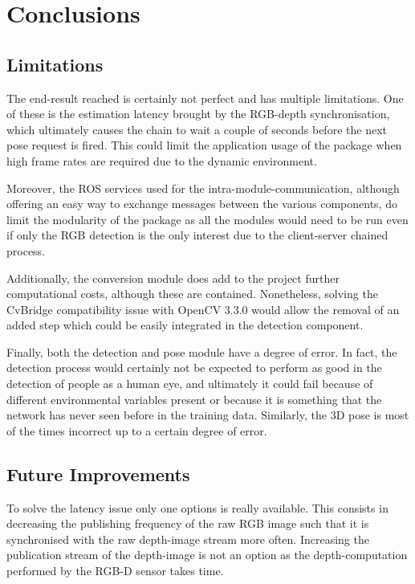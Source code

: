 \chapter{Conclusions}
\label{chapter8}

\section{Limitations}

The end-result reached is certainly not perfect and has multiple limitations. One of these is the estimation latency brought by the RGB-depth synchronisation, which ultimately causes the chain to wait a couple of seconds before the next pose request is fired. This could limit the application usage of the package when high frame rates are required due to the dynamic environment.

Moreover, the ROS services used for the intra-module-communication, although offering an easy way to exchange messages between the various components, do limit the modularity of the package as all the modules would need to be run even if only the RGB detection is the only interest due to the client-server chained process.

Additionally, the conversion module does add to the project further computational costs, although these are contained. Nonetheless, solving the CvBridge compatibility issue with OpenCV 3.3.0 would allow the removal of an added step which could be easily integrated in the detection component.

Finally, both the detection and pose module have a degree of error. In fact, the detection process would certainly not be expected to perform as good in the detection of people as a human eye, and ultimately it could fail because of different environmental variables present or because it is something that the network has never seen before in the training data. Similarly, the 3D pose is most of the times incorrect up to a certain degree of error.

\section{Future Improvements}

To solve the latency issue only one options is really available. This consists in decreasing the publishing frequency of the raw RGB image such that it is synchronised with the raw depth-image stream more often. Increasing the publication stream of the depth-image is not an option as the depth-computation performed by the RGB-D sensor takes time.

